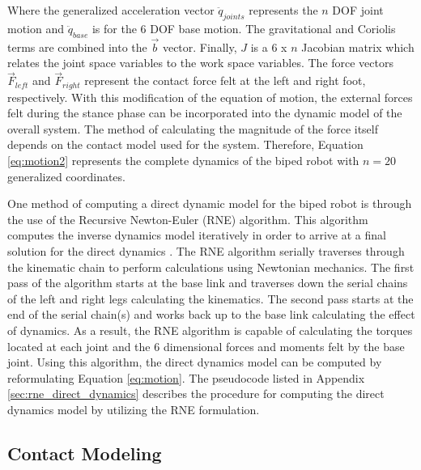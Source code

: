Where the generalized acceleration vector $\ddot{q}_{joints}$ represents the $n$ DOF joint motion and $\ddot{q}_{base}$ is for the 6 DOF base motion. The gravitational and Coriolis terms are combined into the $\vec{b}$ vector. Finally, $J$ is a 6 x $n$ Jacobian matrix which relates the joint space variables to the work space variables. The force vectors $\vec{F}_{left}$ and $\vec{F}_{right}$ represent the contact force felt at the left and right foot, respectively. With this modification of the equation of motion, the external forces felt during the stance phase can be incorporated into the dynamic model of the overall system. The method of calculating the magnitude of the force itself depends on the contact model used for the system. Therefore, Equation \ref{eq:motion2} represents the complete dynamics of the biped robot with $n = 20$ generalized coordinates.

One method of computing a direct dynamic model for the biped robot is through the use of the Recursive Newton-Euler (RNE) algorithm. This algorithm computes the inverse dynamics model iteratively in order to arrive at a final solution for the direct dynamics \cite{Perrin:1997wn}. The RNE algorithm serially traverses through the kinematic chain to perform calculations using Newtonian mechanics. The first pass of the algorithm starts at the base link and traverses down the serial chains of the left and right legs calculating the kinematics. The second pass starts at the end of the serial chain(s) and works back up to the base link calculating the effect of dynamics. As a result, the RNE algorithm is capable of calculating the torques located at each joint and the 6 dimensional forces and moments felt by the base joint. Using this algorithm, the direct dynamics model can be computed by reformulating Equation \ref{eq:motion}. The pseudocode listed in Appendix \ref{sec:rne_direct_dynamics} describes the procedure for computing the direct dynamics model by utilizing the RNE formulation.


\subsection{Contact Modeling} %
\label{sec:contact_modelling}

